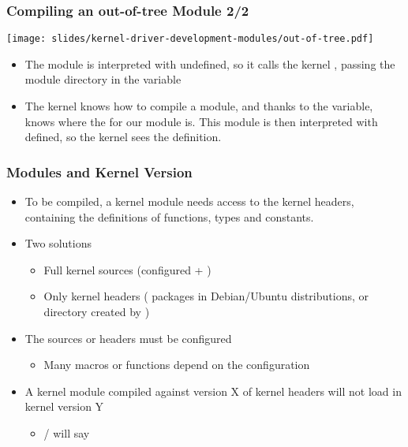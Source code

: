 \begin{frame}
  \frametitle{Compiling an out-of-tree Module 2/2}
  \begin{center}
    \texttt{[image: slides/kernel-driver-development-modules/out-of-tree.pdf]}
  \end{center}
  \begin{itemize}
  \item The module  is interpreted with 
    undefined, so it calls the kernel , passing the module
    directory in the  variable
  \item The kernel  knows how to compile a module, and thanks
    to the  variable, knows where the  for our module
    is. This module  is then interpreted with 
    defined, so the kernel sees the  definition.
  \end{itemize}
\end{frame}

\begin{frame}
  \frametitle{Modules and Kernel Version}
  \begin{itemize}
  \item To be compiled, a kernel module needs access to the kernel
    headers, containing the definitions of functions, types and
    constants.
  \item Two solutions
    \begin{itemize}
    \item Full kernel sources
      (configured + )
    \item Only kernel headers ( packages in
      Debian/Ubuntu distributions, or directory created by )
    \end{itemize}
  \item The sources or headers must be configured
    \begin{itemize}
    \item Many macros or functions depend on the configuration
    \end{itemize}
  \item A kernel module compiled against version X of kernel headers
    will not load in kernel version Y
    \begin{itemize}
    \item {} /  will say 
    \end{itemize}
  \end{itemize}
\end{frame}

